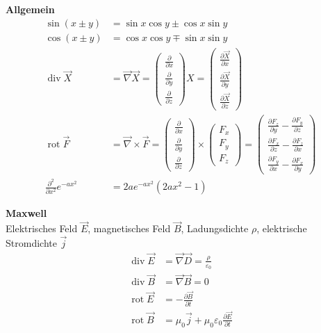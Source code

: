 \documentclass[landscape,8pt]{scrartcl}
\newcommand{\myheading}[1]{\noindent\textbf{#1}\\}
\begin{document}
\begin{multicols}{3}
\myheading{Allgemein}
\begin{align*}
\sin(x\pm y) &= \sin x \cos y \pm \cos x \sin y	\\
\cos(x\pm y) &= \cos x \cos y \mp \sin x \sin y \\
\operatorname{div} \vec X &= \vec \nabla \vec X 
= \begin{pmatrix}\frac{\partial}{\partial x}\\\frac{\partial}{\partial y}\\\frac{\partial}{\partial z}\end{pmatrix}X 
=\begin{pmatrix}\frac{\partial \vec X}{\partial x}\\\frac{\partial \vec X}{\partial y}\\\frac{\partial \vec X}{\partial z}\end{pmatrix} \\
\operatorname{rot}\vec F &= \vec\nabla\times \vec F =\begin{pmatrix}  \frac{\partial}{\partial x} \\  \frac{\partial}{\partial y} \\  \frac{\partial}{\partial z}\end{pmatrix}\times\begin{pmatrix}  F_x\\  F_y\\  F_z\end{pmatrix}=\begin{pmatrix}  \frac{\partial F_z}{\partial y} - \frac{\partial F_y}{\partial z} \\  \frac{\partial F_x}{\partial z} - \frac{\partial F_z}{\partial x} \\  \frac{\partial F_y}{\partial x} - \frac{\partial F_x}{\partial y}\end{pmatrix}\\
\frac{\partial^2}{\partial x^2} e^{-ax^2} &= 2 a e^{-a x^2} \left(2 a x^2-1\right)
\end{align*}

\myheading{Maxwell}
Elektrisches Feld $\vec E$, magnetisches Feld $\vec B$, Ladungsdichte $\rho$, elektrische Stromdichte $\vec j$
\begin{align*}
\operatorname{div} \vec E &= \vec \nabla \vec D = \frac \rho {\varepsilon_0} \\
\operatorname{div} \vec B &= \vec \nabla \vec B = 0 \\
\operatorname{rot} \vec E &= -\frac{\partial \vec B}{\partial t} \\
\operatorname{rot} \vec B &= \mu_0 \vec j+ \mu_0 \varepsilon_0 \frac{\partial \vec E}{\partial t} \\
\end{align*}
 
 
 
\end{multicols}
\end{document}
